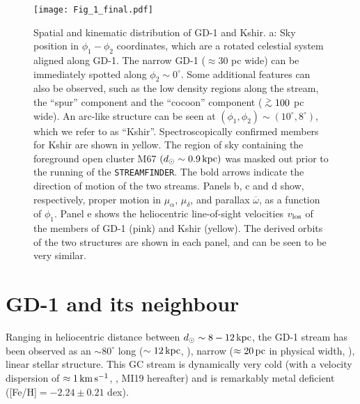 \documentclass[apj]{emulateapj}
\def\gtsima{$\; \buildrel > \over \sim \;$}
\def\simgt{\lower.5ex\hbox{\gtsima}}
\def\kms{{\rm\,km\,s^{-1}}}
\def\pc{{\rm\,pc}}
\def\kpc{{\rm\,kpc}}
\def\deg{^\circ}
\def\gtsima{$\; \buildrel > \over \sim \;$}
\begin{document}
\begin{figure*}
\begin{center}
\vspace{-0.3cm}
\texttt{[image: Fig\_1\_final.pdf]}
\end{center}
\vspace{-0.5cm}
\caption{Spatial and kinematic distribution of GD-1 and Kshir. a: Sky position in $\phi_1-\phi_2$ coordinates, which are a rotated celestial system aligned along GD-1. The narrow GD-1 ($\approx 30$ pc wide) can be immediately spotted along $\phi_2 \sim 0\deg$. Some additional features can also be observed, such as the low density regions along the stream, the ``spur'' component and the ``cocoon'' component ($\simgt 100$ pc wide). An arc-like structure can be seen at $(\phi_1,\phi_2) \sim (10\deg,8\deg)$, which we refer to as ``Kshir''. Spectroscopically confirmed members for Kshir are shown in yellow. The region of  sky containing the foreground open cluster M67 $(d_{\odot}\sim 0.9\kpc)$ was masked out prior to the running of the \texttt{STREAMFINDER}. The bold arrows indicate the direction of motion of the two streams. Panels b, c and d show, respectively, proper motion in $\mu_{\alpha}$, $\mu_{\delta}$, and parallax $\overline{\mathbb{\omega}}$, as a function of $\phi_1$. Panel e shows the heliocentric line-of-sight velocities $v_{\rm los}$ of the members of GD-1 (pink) and Kshir (yellow). The derived orbits of the two structures are shown in each panel, and can be seen to be very similar.}
\label{fig:Fig_1_new}
\end{figure*}



\section{GD-1 and its neighbour}\label{sec:GD1_and_sibling}

Ranging in heliocentric distance between $d_{\odot} \sim 8-12\kpc$, the GD-1 stream \citep{GrillmairGD12006} has been observed as an $\sim 80\deg$ long ($\sim 12\kpc$, \citealt{WhelanBonacaGD12018}), narrow ($\approx 20\pc$ in physical width, \citealt{Koposov2010}), linear stellar structure. This GC stream is dynamically very cold (with a velocity dispersion of $\approx 1 \kms$, \citealt{Malhan2018PotentialGD1}, MI19 hereafter) and is remarkably metal deficient ([Fe/H]$= -2.24\pm0.21$ dex).
\end{document}
